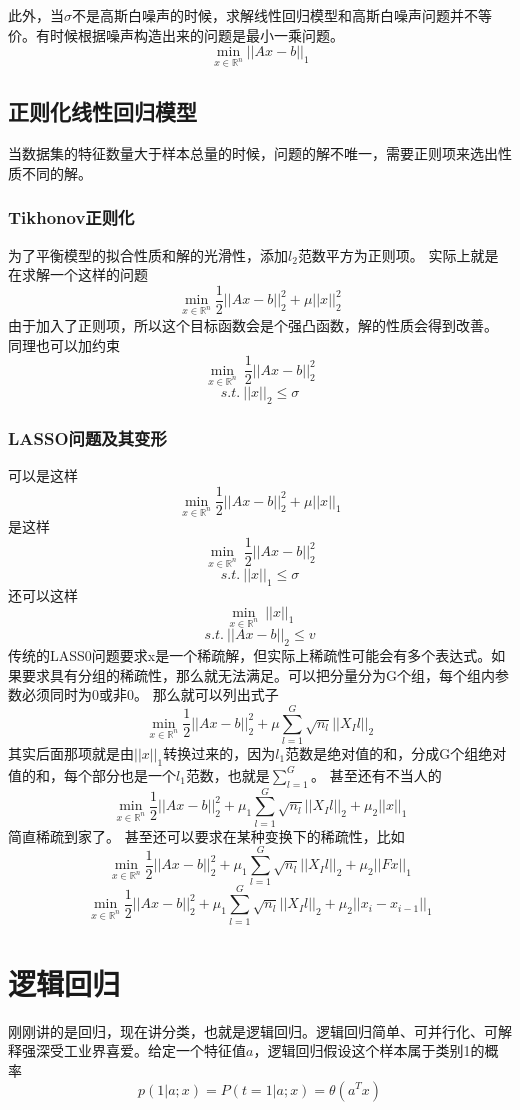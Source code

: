\documentclass{article}
\begin{document}
此外，当$\sigma$不是高斯白噪声的时候，求解线性回归模型和高斯白噪声问题并不等价。有时候根据噪声构造出来的问题是最小一乘问题。
$$
\min\limits_{x\in \mathbb{R}^n} ||Ax-b||_1
$$
\subsection{正则化线性回归模型}
当数据集的特征数量大于样本总量的时候，问题的解不唯一，需要正则项来选出性质不同的解。
\subsubsection{Tikhonov正则化}
为了平衡模型的拟合性质和解的光滑性，添加$l_2$范数平方为正则项。
实际上就是在求解一个这样的问题
$$
\min\limits_{x \in \mathbb{R}^n} \frac{1}{2} ||Ax-b||^2_2+\mu ||x||^2_2
$$
由于加入了正则项，所以这个目标函数会是个强凸函数，解的性质会得到改善。
同理也可以加约束
$$
\min\limits_{x \in \mathbb{R}^n} \ \frac{1}{2} ||Ax-b||^2_2
$$
$$
s.t. \ ||x||_2 \le \sigma
$$
\subsubsection{LASSO问题及其变形}
可以是这样
$$
\min\limits_{x \in \mathbb{R}^n} \frac{1}{2} ||Ax-b||^2_2+\mu ||x||_1
$$
是这样
$$
\min\limits_{x \in \mathbb{R}^n} \ \frac{1}{2} ||Ax-b||^2_2
$$
$$
s.t. \ ||x||_1 \le \sigma
$$
还可以这样
$$
\min\limits_{x \in \mathbb{R}^n} \ ||x||_1 
$$
$$
s.t. \ ||Ax-b||_2 \le v
$$
传统的LASS0问题要求x是一个稀疏解，但实际上稀疏性可能会有多个表达式。如果要求具有分组的稀疏性，那么就无法满足。可以把分量分为G个组，每个组内参数必须同时为0或非0。
那么就可以列出式子
$$
\min\limits_{x \in \mathbb{R}^n} \frac{1}{2} ||Ax-b||^2_2+\mu \sum\limits_{l=1}^G
\sqrt{n_l}||X_Il||_2
$$
其实后面那项就是由$||x||_1 $转换过来的，因为$l_1$范数是绝对值的和，分成G个组绝对值的和，每个部分也是一个$l_1$范数，也就是$\sum\limits_{l=1}^G$。
甚至还有不当人的
$$
\min\limits_{x \in \mathbb{R}^n} \frac{1}{2} ||Ax-b||^2_2+\mu_1\sum\limits_{l=1}^G
\sqrt{n_l}||X_Il||_2+\mu_2 ||x||_1
$$
简直稀疏到家了。
甚至还可以要求在某种变换下的稀疏性，比如
$$
\min\limits_{x \in \mathbb{R}^n} \frac{1}{2} ||Ax-b||^2_2+\mu_1\sum\limits_{l=1}^G
\sqrt{n_l}||X_Il||_2+\mu_2 ||Fx||_1
$$
$$
\min\limits_{x \in \mathbb{R}^n} \frac{1}{2} ||Ax-b||^2_2+\mu_1\sum\limits_{l=1}^G
\sqrt{n_l}||X_Il||_2+\mu_2 ||x_i-x_{i-1}||_1
$$
\section{逻辑回归}
刚刚讲的是回归，现在讲分类，也就是逻辑回归。逻辑回归简单、可并行化、可解释强深受工业界喜爱。给定一个特征值$a$，逻辑回归假设这个样本属于类别1的概率
$$
p(1|a;x)=P(t=1|a;x)=\theta(a^Tx)
$$
\end{document}
